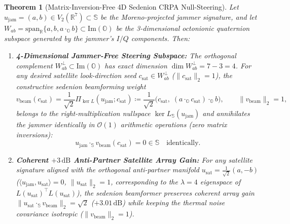 \documentclass[11pt,a4paper]{article}
\newtheorem{theorem}{Theorem}[section]
\theoremstyle{definition}
\theoremstyle{remark}
\newcommand{\R}{\mathbb{R}}
\newcommand{\Oc}{\mathbb{O}}
\newcommand{\Se}{\mathbb{S}}
\newcommand{\ImPart}{\mathrm{Im}}
\newcommand{\PiNull}{\Pi_{\ker L}}
\begin{document}
\begin{theorem}[Matrix-Inversion-Free 4D Sedenion CRPA Null-Steering]
\label{thm:crpa_null}
Let $u_{\mathrm{jam}} = (a, b) \in V_2(\R^7) \subset \Se$ be the Moreno-projected jammer signature, and let $W_{ab} = \mathrm{span}_{\R}\{a, b, a \cdot_{\Oc} b\} \subset \ImPart(\Oc)$ be the 3-dimensional octonionic quaternion subspace generated by the jammer's $I/Q$ components. Then:
\begin{enumerate}
    \item \textbf{4-Dimensional Jammer-Free Steering Subspace:} The orthogonal complement $W_{ab}^\perp \subset \ImPart(\Oc)$ has exact dimension $\dim W_{ab}^\perp = 7 - 3 = 4$. For any desired satellite look-direction seed $c_{\mathrm{sat}} \in W_{ab}^\perp$ ($\|c_{\mathrm{sat}}\|_2 = 1$), the constructive sedenion beamforming weight
    \begin{equation}
    \label{eq:v_beam}
    v_{\mathrm{beam}}(c_{\mathrm{sat}}) = \frac{1}{\sqrt{2}} \PiNull(u_{\mathrm{jam}}; c_{\mathrm{sat}}) \coloneqq \frac{1}{\sqrt{2}}\Big(c_{\mathrm{sat}}, \; (a \cdot_{\Oc} c_{\mathrm{sat}}) \cdot_{\Oc} b\Big), \qquad \|v_{\mathrm{beam}}\|_2 = 1,
    \end{equation}
    belongs to the right-multiplication nullspace $\ker L_{\Se}(u_{\mathrm{jam}})$ and annihilates the jammer identically in $\mathcal{O}(1)$ arithmetic operations (zero matrix inversions):
    \begin{equation}
    \label{eq:jam_zero}
    u_{\mathrm{jam}} \cdot_{\Se} v_{\mathrm{beam}}(c_{\mathrm{sat}}) = 0 \in \Se \quad \text{identically.}
    \end{equation}
    \item \textbf{Coherent $+3\,\mathrm{dB}$ Anti-Partner Satellite Array Gain:} For any satellite signature aligned with the orthogonal anti-partner manifold $u_{\mathrm{sat}} = \frac{1}{\sqrt{2}}(a, -b)$ ($\langle u_{\mathrm{jam}}, u_{\mathrm{sat}} \rangle = 0$, $\|u_{\mathrm{sat}}\|_2 = 1$, corresponding to the $\lambda = 4$ eigenspace of $L(u_{\mathrm{sat}})^\top L(u_{\mathrm{sat}})$), the sedenion beamformer preserves coherent array gain $\|u_{\mathrm{sat}} \cdot_{\Se} v_{\mathrm{beam}}\|_2 = \sqrt{2}$ ($+3.01\,\mathrm{dB}$) while keeping the thermal noise covariance isotropic ($\|v_{\mathrm{beam}}\|_2 = 1$).
\end{enumerate}
\end{theorem}
\end{document}
